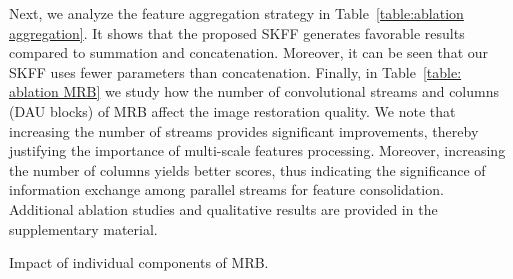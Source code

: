 \documentclass[runningheads]{llncs}
\begin{document}
Next, we analyze the feature aggregation strategy in Table~\ref{table:ablation aggregation}. It shows that the proposed SKFF generates favorable results compared to summation and concatenation. Moreover, it can be seen that our SKFF uses  fewer parameters than concatenation. 
Finally, in Table~\ref{table: ablation MRB} we study how the number of convolutional streams and columns (DAU blocks) of MRB affect the image restoration quality. 
We note that increasing the number of streams provides significant improvements, thereby justifying the importance of multi-scale features processing. Moreover, increasing the number of columns yields better scores, thus indicating the significance of information exchange among parallel streams for feature consolidation.   
Additional ablation studies and qualitative results are provided in the supplementary material.

\begin{table}[t]
\parbox{.45\linewidth}{
\centering
\caption{\small Impact of individual components of MRB.}
\label{table:ablation main}
\setlength{\tabcolsep}{2pt}
}
\hfill
\parbox{.48\linewidth}{
\centering
\caption{\small Feature aggregation. Our SKFF uses  fewer parameters than concat, but generates better results. }
\label{table:ablation aggregation}
\setlength{\tabcolsep}{12.5pt}
}
\vspace*{-1.5em}
\end{table}
\end{document}
